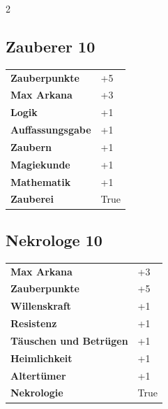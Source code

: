 \begin{multicols}{2}
\begin{tcolorbox}

\end{tcolorbox}

\begin{tcolorbox}
    \subsection*{Zauberer \hfill \small{10 }}
    \tcblower




\begin{tabular}{@{}ll@{}}
    \textbf{Zauberpunkte} & +5\\
    \textbf{Max Arkana} & +3\\
    \textbf{Logik} & +1\\
    \textbf{Auffassungsgabe} & +1\\
    \textbf{Zaubern} & +1\\
    \textbf{Magiekunde} & +1\\
    \textbf{Mathematik} & +1\\
    \textbf{Zauberei} & True\\
\end{tabular}


\end{tcolorbox}

\begin{tcolorbox}
    \subsection*{Nekrologe \hfill \small{10 }}
    \tcblower




\begin{tabular}{@{}ll@{}}
    \textbf{Max Arkana} & +3\\
    \textbf{Zauberpunkte} & +5\\
    \textbf{Willenskraft} & +1\\
    \textbf{Resistenz} & +1\\
    \textbf{Täuschen und Betrügen} & +1\\
    \textbf{Heimlichkeit} & +1\\
    \textbf{Altertümer} & +1\\
    \textbf{Nekrologie} & True\\
\end{tabular}


\end{tcolorbox}
\end{multicols}
